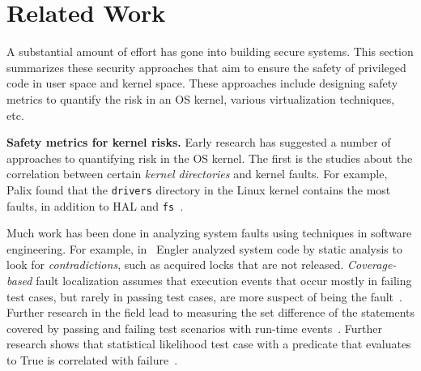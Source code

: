 \section{Related Work}
\label{sec.related_work}

A substantial amount of effort has gone into building secure systems. 
This section summarizes these security approaches 
that aim to ensure the safety of privileged code in user space and kernel space.
These approaches include designing safety metrics to quantify the risk in an 
OS kernel, various virtualization techniques, etc.


\textbf{Safety metrics for kernel risks.}
Early research has suggested a number of approaches to quantifying risk 
in the OS kernel. The first is the studies about the correlation between certain 
\textit{kernel directories} and kernel faults. For example, 
Palix found that the \texttt{drivers} directory in the Linux kernel contains the
most faults, in addition to HAL and \texttt{fs}~\cite{palix2011faults}.

Much work has been done in analyzing system faults using techniques in 
software engineering. For example, 
in~\cite{engler2001bugs} Engler analyzed system code by static analysis
to look for \textit{contradictions}, such as acquired locks that are
not released.
%
%
%
\textit{Coverage-based} fault localization assumes that execution events that occur mostly in failing
test cases, but rarely in passing test cases, are more {suspect}
of being the fault~\cite{jones2002visualization}. Further research in the field lead to measuring the set
difference of the statements covered by passing and failing test scenarios with run-time events~\cite{agrawal1995fault, jones2005empirical}.
Further research shows that statistical likelihood test case with a predicate that evaluates to True
is correlated with failure~\cite{liblit2005scalable}.


